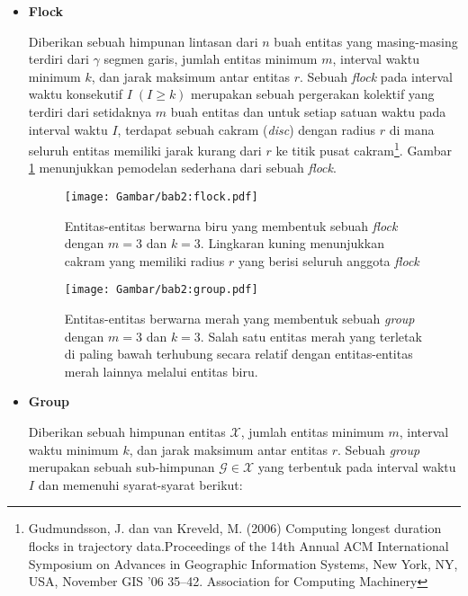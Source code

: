 \documentclass[a4paper,twoside]{article}
\begin{document}
\begin{itemize}[noitemsep, nolistsep]
    \item \textbf{Flock}
    
    Diberikan sebuah himpunan lintasan dari $n$ buah entitas yang masing-masing terdiri dari $\gamma$ segmen garis, jumlah entitas minimum $m$, interval waktu minimum $k$, dan jarak maksimum antar entitas $r$. Sebuah \textit{flock} pada interval waktu konsekutif $I\;(I \geq k)$ merupakan sebuah pergerakan kolektif yang terdiri dari setidaknya $m$ buah entitas dan untuk setiap satuan waktu pada interval waktu $I$, terdapat sebuah cakram (\textit{disc}) dengan radius $r$ di mana seluruh entitas memiliki jarak kurang dari $r$ ke titik pusat cakram\footnote{Gudmundsson, J. dan van Kreveld, M. (2006) Computing longest duration flocks in trajectory data.Proceedings of the 14th Annual ACM International Symposium on Advances in Geographic Information Systems, New York, NY, USA, November GIS ’06 35–42. Association for Computing Machinery}. Gambar \ref{bab2:flock} menunjukkan pemodelan sederhana dari sebuah \textit{flock}.
    
    \begin{figure}[h]
        \centering
        \texttt{[image: Gambar/bab2:flock.pdf]}
        \caption[Sebuah \textit{flock}]{Entitas-entitas berwarna biru yang membentuk sebuah \textit{flock} dengan $m = 3$ dan $k = 3$. Lingkaran kuning menunjukkan cakram yang memiliki radius $r$ yang berisi seluruh anggota \textit{flock}}
        \label{bab2:flock}
    \end{figure}
    
    \begin{figure}[t]
        \centering
        \texttt{[image: Gambar/bab2:group.pdf]}
        \caption[Sebuah \textit{group}]{Entitas-entitas berwarna merah yang membentuk sebuah \textit{group} dengan $m = 3$ dan $k = 3$. Salah satu entitas merah yang terletak di paling bawah terhubung secara relatif dengan entitas-entitas merah lainnya melalui entitas biru.}
        \label{bab2:group}
    \end{figure}
    
    \item \textbf{Group}
    
    Diberikan sebuah himpunan entitas $\mathcal{X}$, jumlah entitas minimum $m$, interval waktu minimum $k$, dan jarak maksimum antar entitas $r$. Sebuah \textit{group} merupakan sebuah sub-himpunan $\mathcal{G} \in \mathcal{X}$ yang terbentuk pada interval waktu $I$ dan memenuhi syarat-syarat berikut:
    

\end{itemize}
\end{document}
